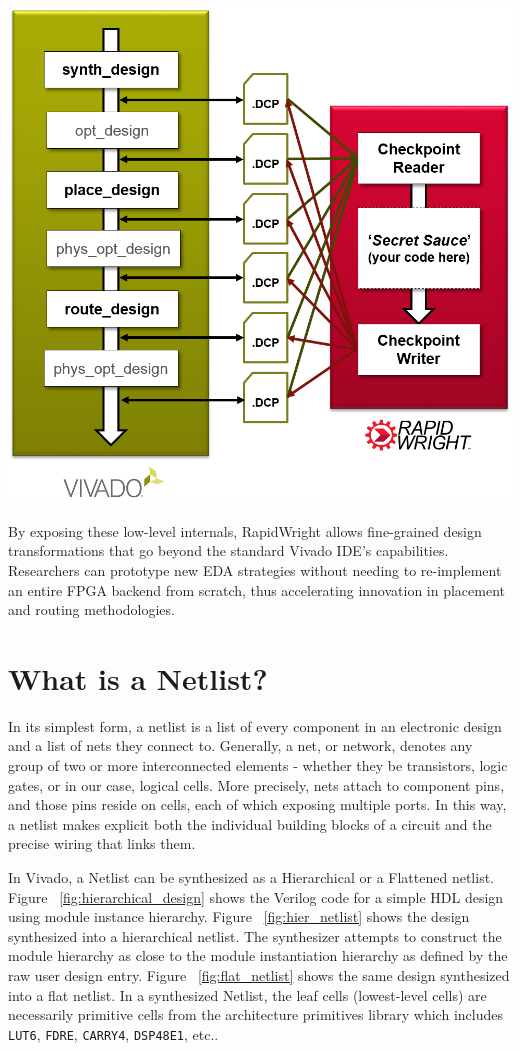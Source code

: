 \documentclass{article}
\begin{document}
\begin{multicols}{2}
    {
        \centering
        \includegraphics[width=0.8\columnwidth]{figures/vivado_dcps.png}
        \label{fig:vivado_dcps}
    }

    By exposing these low-level internals, RapidWright allows fine-grained design transformations that go beyond the standard Vivado IDE’s capabilities. 
    Researchers can prototype new EDA strategies without needing to re-implement an entire FPGA backend from scratch, thus accelerating innovation in placement and routing methodologies.

\newpage
\section{What is a Netlist?}
    \label{sec:netlist}
    In its simplest form, a netlist is a list of every component in an electronic design and a list of nets they connect to. 
    Generally, a net, or network, denotes any group of two or more interconnected elements - whether they be transistors, logic gates, or in our case, logical cells. 
    More precisely, nets attach to component pins, and those pins reside on cells, each of which exposing multiple ports. 
    In this way, a netlist makes explicit both the individual building blocks of a circuit and the precise wiring that links them. 

    In Vivado, a Netlist can be synthesized as a Hierarchical or a Flattened netlist. 
    Figure ~\ref{fig:hierarchical_design} shows the Verilog code for a simple HDL design using module instance hierarchy. 
    Figure ~\ref{fig:hier_netlist} shows the design synthesized into a hierarchical netlist. 
    The synthesizer attempts to construct the module hierarchy as close to the module instantiation hierarchy as defined by the raw user design entry. 
    Figure ~\ref{fig:flat_netlist} shows the same design synthesized into a flat netlist. 
    In a synthesized Netlist, the leaf cells (lowest-level cells) are necessarily primitive cells from the architecture primitives library which includes \texttt{LUT6}, \texttt{FDRE}, \texttt{CARRY4}, \texttt{DSP48E1}, etc.. 

    \end{multicols}
\end{document}

